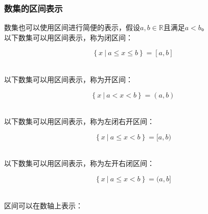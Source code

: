 \documentclass[UTF8]{ctexart}
\begin{document}
\subsubsection{数集的区间表示}
    数集也可以使用区间进行简便的表示，假设$a,b\in\mathbb{R}$且满足$a<b$。\\[3mm]
    以下数集可以用区间表示，称为闭区间：
    \begin{large}
        \begin{equation*}
            \left\{x~|~a\leq x\leq b\right\}=[a,b]
        \end{equation*}
    \end{large}\\
    以下数集可以用区间表示，称为开区间：
    \begin{large}
        \begin{equation*}
            \left\{x~|~a<x<b\right\}=(a,b)
        \end{equation*}
    \end{large}\\
    以下数集可以用区间表示，称为左闭右开区间：
    \begin{large}
        \begin{equation*}
            \left\{x~|~a\leq x<b\right\}=[a,b)
        \end{equation*}
    \end{large}\\
    以下数集可以用区间表示，称为左开右闭区间：
    \begin{large}
        \begin{equation*}
            \left\{x~|~a\leq x<b\right\}=(a,b]
        \end{equation*}
    \end{large}\\
    区间可以在数轴上表示：
\end{document}
